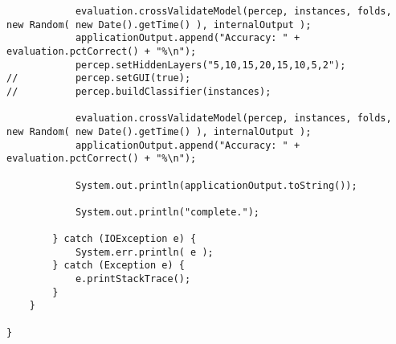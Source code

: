 \begin{lstlisting}
			evaluation.crossValidateModel(percep, instances, folds, new Random( new Date().getTime() ), internalOutput );
			applicationOutput.append("Accuracy: " + evaluation.pctCorrect() + "%\n");
			percep.setHiddenLayers("5,10,15,20,15,10,5,2");
//			percep.setGUI(true);
//			percep.buildClassifier(instances);
			
			evaluation.crossValidateModel(percep, instances, folds, new Random( new Date().getTime() ), internalOutput );
			applicationOutput.append("Accuracy: " + evaluation.pctCorrect() + "%\n");

			System.out.println(applicationOutput.toString());
			
			System.out.println("complete.");

		} catch (IOException e) {
			System.err.println( e );
		} catch (Exception e) {
			e.printStackTrace();
		}
	}

}
\end{lstlisting}



